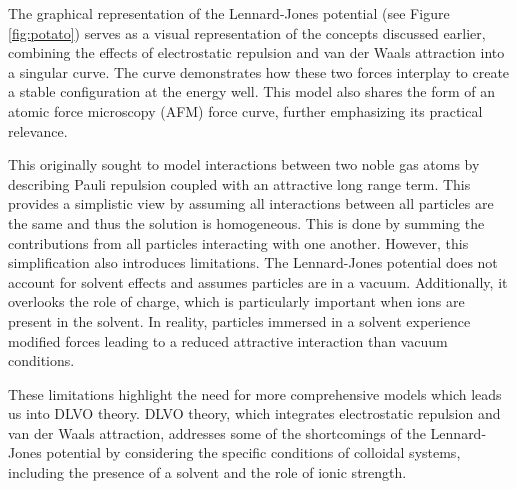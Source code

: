 The graphical representation of the Lennard-Jones potential (see Figure \ref{fig:potato}) serves as a visual representation of the concepts discussed earlier, combining the effects of electrostatic repulsion and van der Waals attraction into a singular curve. The curve demonstrates how these two forces interplay to create a stable configuration at the energy well. This model also shares the form of an atomic force microscopy (AFM) force curve, further emphasizing its practical relevance. 


This originally sought to model interactions between two noble gas atoms by describing Pauli repulsion coupled with an attractive long range term. This provides a simplistic view by assuming all interactions between all particles are the same and thus the solution is homogeneous. This is done by summing the contributions from all particles interacting with one another. However, this simplification also introduces limitations. The Lennard-Jones potential does not account for solvent effects and assumes particles are in a vacuum. Additionally, it overlooks the role of charge, which is particularly important when ions are present in the solvent. In reality, particles immersed in a solvent experience modified forces leading to a reduced attractive interaction than vacuum conditions.
\cite{lilBlueBook}








These limitations highlight the need for more comprehensive models which leads us into DLVO theory. DLVO theory, which integrates electrostatic repulsion and van der Waals attraction, addresses some of the shortcomings of the Lennard-Jones potential by considering the specific conditions of colloidal systems, including the presence of a solvent and the role of ionic strength.\cite{libretexts2020} %

